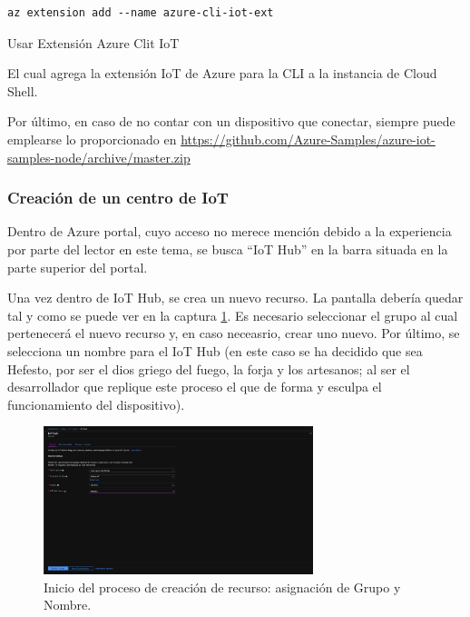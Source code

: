 \documentclass[english,runningheads,a4paper]{llncs}[2018/03/10]
\begin{document}
\begin{listing}[htp]
\centering
    \begin{verbatim} 
az extension add --name azure-cli-iot-ext
    \end{verbatim}
\caption{Usar Extensión Azure Clit IoT}
\label{eq:azurecli}
\end{listing}

El cual agrega la extensión IoT de Azure para la CLI a la instancia de Cloud
Shell.

Por último, en caso de no contar con un dispositivo que conectar, siempre puede
emplearse lo proporcionado en 
\url{https://github.com/Azure-Samples/azure-iot-samples-node/archive/master.zip}

\subsubsection{Creación de un centro de IoT}

Dentro de Azure portal, cuyo acceso no merece mención debido a la experiencia
por parte del lector en este tema, se busca ``IoT Hub'' en la barra situada en
la parte superior del portal.

Una vez dentro de IoT Hub, se crea un nuevo recurso. La pantalla debería quedar
tal y como se puede ver en la captura
\hyperref[createresource]{\ref{createresource}}. Es necesario seleccionar el
grupo al cual pertenecerá el nuevo recurso y, en caso neceasrio, crear uno
nuevo. Por último, se selecciona un nombre para el IoT Hub (en este caso se ha
decidido que sea Hefesto, por ser el dios griego del fuego, la forja y los
artesanos; al ser el desarrollador que replique este proceso el que de forma y
esculpa el funcionamiento del dispositivo).

\begin{figure}[h!]
 \centering
 \includegraphics[width=0.7\textwidth]{./IoT/MicrosoftAzure/1-1_create_resource.png}
 \caption{Inicio del proceso de creación de recurso: asignación de Grupo y
 Nombre.}
 \label{createresource}
\end{figure}
\end{document}
